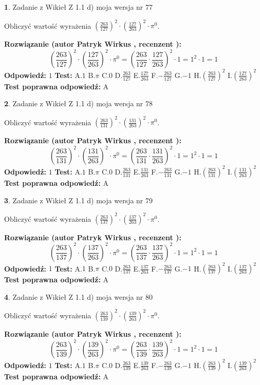 \documentclass[12pt, a4paper]{article}
\theoremstyle{definition} %
\newtheorem{zad}{}
\newcommand{\zadStart}[1]{\begin{zad}#1\newline}
\newcommand{\zadStop}{\end{zad}}
\newcommand{\rozwStart}[2]{\noindent \textbf{Rozwiązanie (autor #1 , recenzent #2): }\newline}
\newcommand{\rozwStop}{\newline}
\newcommand{\odpStart}{\noindent \textbf{Odpowiedź:}\newline}
\newcommand{\odpStop}{\newline}
\newcommand{\testStart}{\noindent \textbf{Test:}\newline}
\newcommand{\testStop}{\newline}
\newcommand{\kluczStart}{\noindent \textbf{Test poprawna odpowiedź:}\newline}
\newcommand{\kluczStop}{\newline}
\begin{document}
\zadStart{Zadanie z Wikieł Z 1.1 d) moja wersja nr 77}

Obliczyć wartość wyrażenia $(\frac{263}{127})^{2} \cdot (\frac{127}{263})^{2} \cdot \pi^{0}$.
\zadStop
\rozwStart{Patryk Wirkus}{}
$$(\frac{263}{127})^{2} \cdot (\frac{127}{263})^{2} \cdot \pi^{0} = (\frac{263}{127} \cdot \frac{127}{263})^{2} \cdot 1 = 1^{2} \cdot 1 = 1$$
\rozwStop
\odpStart
$1$
\odpStop
\testStart
A.$1$ B.$\pi$ C.$0$ D.$\frac{263}{127}$ E.$\frac{127}{263}$
F.$-\frac{263}{127}$ G.$-1$
H.$(\frac{263}{127})^{2}$
I.$(\frac{127}{263})^{2}$
\testStop
\kluczStart
A
\kluczStop



\zadStart{Zadanie z Wikieł Z 1.1 d) moja wersja nr 78}

Obliczyć wartość wyrażenia $(\frac{263}{131})^{2} \cdot (\frac{131}{263})^{2} \cdot \pi^{0}$.
\zadStop
\rozwStart{Patryk Wirkus}{}
$$(\frac{263}{131})^{2} \cdot (\frac{131}{263})^{2} \cdot \pi^{0} = (\frac{263}{131} \cdot \frac{131}{263})^{2} \cdot 1 = 1^{2} \cdot 1 = 1$$
\rozwStop
\odpStart
$1$
\odpStop
\testStart
A.$1$ B.$\pi$ C.$0$ D.$\frac{263}{131}$ E.$\frac{131}{263}$
F.$-\frac{263}{131}$ G.$-1$
H.$(\frac{263}{131})^{2}$
I.$(\frac{131}{263})^{2}$
\testStop
\kluczStart
A
\kluczStop



\zadStart{Zadanie z Wikieł Z 1.1 d) moja wersja nr 79}

Obliczyć wartość wyrażenia $(\frac{263}{137})^{2} \cdot (\frac{137}{263})^{2} \cdot \pi^{0}$.
\zadStop
\rozwStart{Patryk Wirkus}{}
$$(\frac{263}{137})^{2} \cdot (\frac{137}{263})^{2} \cdot \pi^{0} = (\frac{263}{137} \cdot \frac{137}{263})^{2} \cdot 1 = 1^{2} \cdot 1 = 1$$
\rozwStop
\odpStart
$1$
\odpStop
\testStart
A.$1$ B.$\pi$ C.$0$ D.$\frac{263}{137}$ E.$\frac{137}{263}$
F.$-\frac{263}{137}$ G.$-1$
H.$(\frac{263}{137})^{2}$
I.$(\frac{137}{263})^{2}$
\testStop
\kluczStart
A
\kluczStop



\zadStart{Zadanie z Wikieł Z 1.1 d) moja wersja nr 80}

Obliczyć wartość wyrażenia $(\frac{263}{139})^{2} \cdot (\frac{139}{263})^{2} \cdot \pi^{0}$.
\zadStop
\rozwStart{Patryk Wirkus}{}
$$(\frac{263}{139})^{2} \cdot (\frac{139}{263})^{2} \cdot \pi^{0} = (\frac{263}{139} \cdot \frac{139}{263})^{2} \cdot 1 = 1^{2} \cdot 1 = 1$$
\rozwStop
\odpStart
$1$
\odpStop
\testStart
A.$1$ B.$\pi$ C.$0$ D.$\frac{263}{139}$ E.$\frac{139}{263}$
F.$-\frac{263}{139}$ G.$-1$
H.$(\frac{263}{139})^{2}$
I.$(\frac{139}{263})^{2}$
\testStop
\kluczStart
A
\kluczStop
\end{document}

